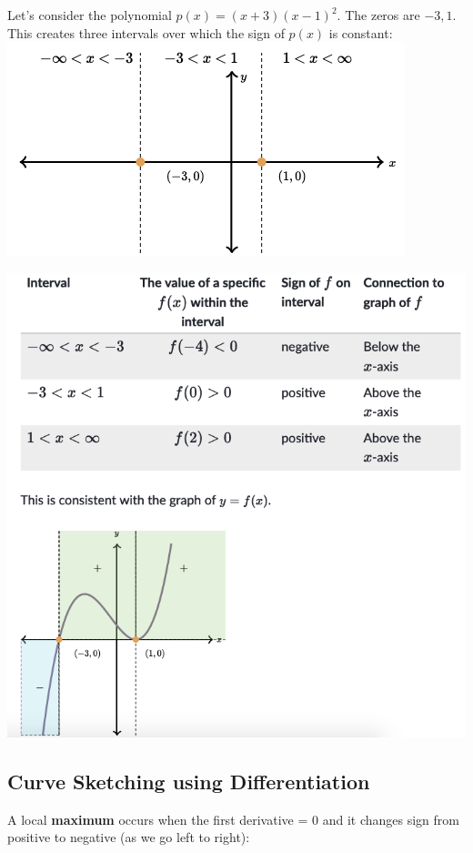 \documentclass{book}
\begin{document}
	Let's consider the polynomial $p(x) = (x+3)(x-1)^2$. The zeros are $-3,1$. This creates three intervals over which the sign of $p(x)$ is constant:
	\\
	
	\includegraphics[scale=0.5]{pinterval2}
	
	\includegraphics[scale=0.6]{pinterval3}
	
	\subsection{Curve Sketching using Differentiation}
	
	A local \textbf{maximum} occurs when the first derivative = 0 and it changes sign from positive to negative (as we go left to right):
	
\end{document}
